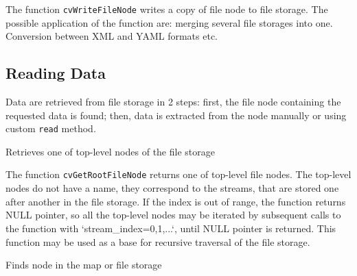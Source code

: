 The function \texttt{cvWriteFileNode} writes a copy of file node to file storage. The possible application of the function are: merging several file storages into one. Conversion between XML and YAML formats etc.

\subsection{Reading Data}

Data are retrieved from file storage in 2 steps: first, the file node
containing the requested data is found; then, data is extracted from
the node manually or using custom \texttt{read} method.

\label{GetRootFileNode}

Retrieves one of top-level nodes of the file storage


\begin{description}
\end{description}

The function \texttt{cvGetRootFileNode} returns one of top-level file
nodes. The top-level nodes do not have a name, they correspond to the
streams, that are stored one after another in the file storage. If the
index is out of range, the function returns NULL pointer, so all the
top-level nodes may be iterated by subsequent calls to the function with
`stream\_index=0,1,...`, until NULL pointer is returned. This function
may be used as a base for recursive traversal of the file storage.

\label{GetFileNodeByName}

Finds node in the map or file storage


